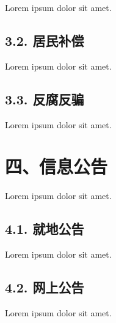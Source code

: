 Lorem ipsum dolor sit amet.

\subsection*{3.2. 居民补偿}

Lorem ipsum dolor sit amet.

\subsection*{3.3. 反腐反骗}

Lorem ipsum dolor sit amet.

\section*{四、信息公告}

Lorem ipsum dolor sit amet.

\subsection*{4.1. 就地公告}

Lorem ipsum dolor sit amet.

\subsection*{4.2. 网上公告}

Lorem ipsum dolor sit amet.














